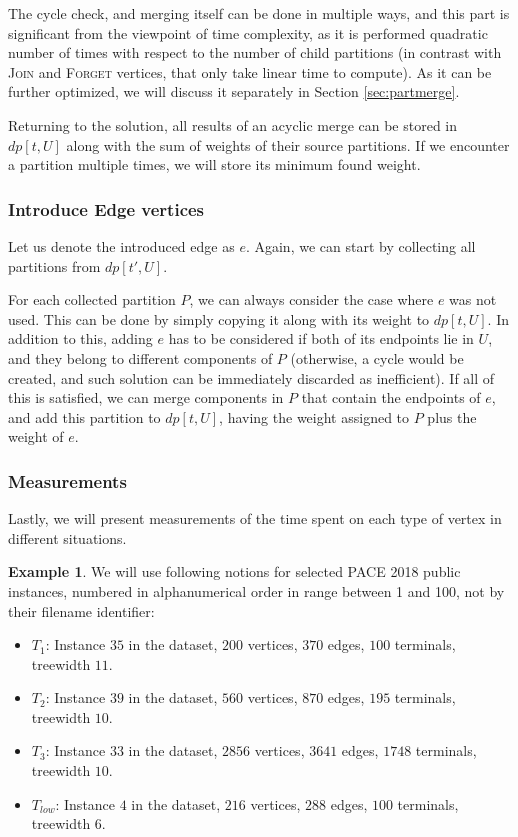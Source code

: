\documentclass[thesis=M,english,hidelinks]{FITthesis}[2012/10/20]
\theoremstyle{definition}
\newtheorem{example}{Example}
\begin{document}
The cycle check, and merging itself can be done in multiple ways, and this part is significant from the viewpoint of
time complexity, as it is performed quadratic number of times with respect to the number of child partitions (in
contrast with \textsc{Join} and \textsc{Forget} vertices, that only take linear time to compute). As it can be further
optimized, we will discuss it separately in Section \ref{sec:partmerge}.

Returning to the solution, all results of an acyclic merge can be stored in $dp[t, U]$ along with the sum of weights of
their source partitions. If we encounter a partition multiple times, we will store its minimum found weight.

\subsubsection*{Introduce Edge vertices}

Let us denote the introduced edge as $e$. Again, we can start by collecting all partitions from $dp[t', U]$.

For each collected partition $P$, we can always consider the case where $e$ was not used. This can be done by simply
copying it along with its weight to $dp[t, U]$. In addition to this, adding $e$ has to be considered if both of its
endpoints lie in $U$, and they belong to different components of $P$ (otherwise, a cycle would be created, and such
solution can be immediately discarded as inefficient). If all of this is satisfied, we can merge components in $P$
that contain the endpoints of $e$, and add this partition to $dp[t, U]$, having the weight assigned to $P$
plus the weight of $e$.

\subsubsection*{Measurements}

Lastly, we will present measurements of the time spent on each type of vertex in different situations.

\begin{example}
    \label{ex:tests}
    We will use following notions for selected PACE 2018 public instances, numbered in alphanumerical order in range
    between 1 and 100, not by their filename identifier:
    \begin{itemize}
        \item $T_1$: Instance $35$ in the dataset, $200$ vertices, $370$ edges, $100$ terminals, treewidth $11$.
        \item $T_2$: Instance $39$ in the dataset, $560$ vertices, $870$ edges, $195$ terminals, treewidth $10$.
        \item $T_3$: Instance $33$ in the dataset, $2856$ vertices, $3641$ edges, $1748$ terminals, treewidth $10$.
        \item $T_{low}$: Instance $4$ in the dataset, $216$ vertices, $288$ edges, $100$ terminals, treewidth $6$.
    \end{itemize}

\end{example}
\end{document}
